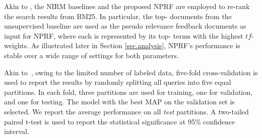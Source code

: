 \documentclass[11pt,a4paper]{article}
\newcommand{\tf}{\ensuremath{\mathit{tf}}}
\begin{document}
Akin to \cite{DBLP:conf/cikm/GuoFAC16,DBLP:conf/sigir/XiongDCLP17,DBLP:conf/emnlp/HuiYBM17}, the NIRM baselines and the proposed NPRF are employed to re-rank the search results from BM25.
In particular,
the top- documents from the unsupervised baseline are used as the pseudo relevance feedback documents  as input for NPRF,
where each  is represented by its top- terms with the highest \tf- weights.
As illustrated later in Section \ref{sec.analysis}, NPRF's performance is stable over a wide range of settings for both parameters.


Akin to~\cite{DBLP:conf/wsdm/HuiYBM18},
owing to the limited number of 
labeled data,
five-fold cross-validation is used to report the results by randomly splitting all queries into five equal partitions.
In each fold,
three partitions are used for training, one for validation, and one for testing. The model with the best MAP on the validation set is selected.
We report the average performance on all \textit{test} partitions. A two-tailed paired t-test 
is used to report the statistical significance at 95\% confidence interval.




 \begin{table*}[tbh]
\centering
{}
\caption{\small Comparisons between NPRF and \textit{BM25} on \textit{TREC1-3} dataset. Relative performances compared with \textit{BM25} are in percentages. Significant improvements relative to the baselines are marked with .}\label{tab.BM25_d12}
\end{table*}
\end{document}

